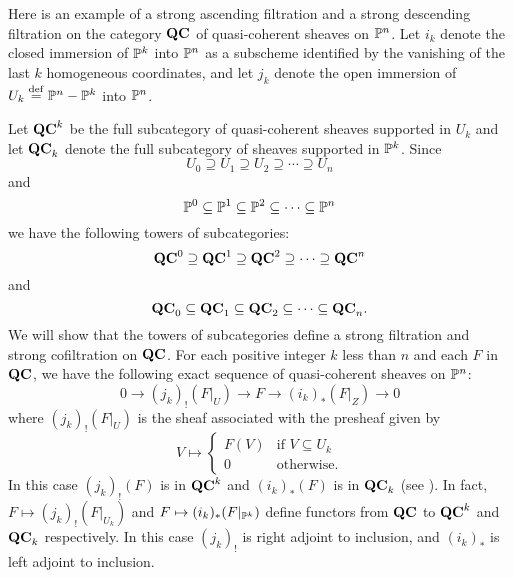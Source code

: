 \begin{ex}
Here is an example of a strong ascending filtration and a strong
descending filtration on the category $\QCoh$ of quasi-coherent
sheaves on $\P^n$. Let $i_k$ denote the closed immersion of $\P^k$ 
into $\P^n$ as a subscheme identified by the vanishing of the last 
$k$ homogeneous coordinates, and let $j_k$ denote the open 
immersion of $U_k \defeq \P^n - \P^k$ into $\P^n$. 

Let $\QCoh^k$ be the full subcategory of quasi-coherent sheaves
supported in $U_k$ and let $\QCoh_k$ denote the full subcategory
of sheaves supported in $\P^k$. Since 
\[
U_0 \supseteq U_1 \supseteq U_2 \supseteq \cdots \supseteq U_n
\]
and
\[
\P^0 \subseteq \P^1 \subseteq \P^2 \subseteq \cdots \subseteq \P^n
\]
we have the following towers of subcategories:
\[
\QCoh^0 \supseteq \QCoh^1 \supseteq \QCoh^2 \supseteq \cdots
   \supseteq \QCoh^n
\]
and 
\[
\QCoh_0 \subseteq \QCoh_1 \subseteq \QCoh_2 \subseteq \cdots
   \subseteq \QCoh_n.
\]
We will show that the towers of subcategories define a strong 
filtration and strong cofiltration on $\QCoh$. For each positive 
integer $k$ less than $n$ and each $F$ in $\QCoh$, we have the 
following exact sequence of quasi-coherent sheaves on $\P^n$:
\begin{equation}\label{eq_qc_sheaf_ses}
0 \to (j_k)_!(F|_U) \to F \to (i_k)_*(F|_Z) \to 0
\end{equation}
where $(j_k)_!(F|_U)$ is the sheaf associated with the presheaf 
given by
\[
V \mapsto \begin{cases}
F(V) &\textrm{if }V \subseteq U_k\\
0    &\textrm{otherwise}.
\end{cases}
\]
In this case $(j_k)_!(F)$ is in $\QCoh^k$ and $(i_k)_*(F)$ is in 
$\QCoh_k$ (see \cite[Ex. 1.19]{Hart}). In fact, $F \mapsto 
(j_k)_!(F|_{U_k})$ and $F \mapsto (i_k)_*(F|_{\P^k})$ define
functors from $\QCoh$ to $\QCoh^k$ and $\QCoh_k$
respectively. In this case $(j_k)_!$ is right adjoint to 
inclusion, and $(i_k)_*$ is left adjoint to inclusion.


\end{ex}
